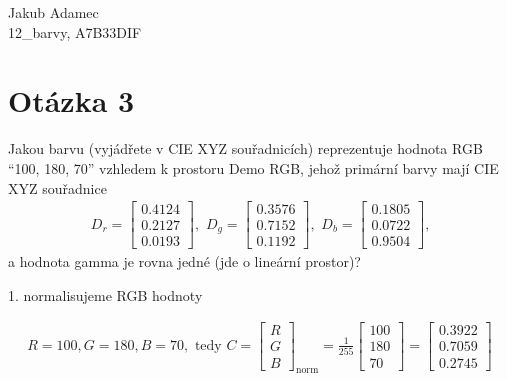 \documentclass[11pt,a4paper]{article}
\author{Jakub Adamec}
\begin{document}
\begin{center}
    \Huge Jakub Adamec \\
    \Large 12\_barvy, A7B33DIF \\ 
\end{center}

\section{Otázka 3} Jakou barvu (vyjádřete v CIE XYZ souřadnicích) reprezentuje hodnota RGB \enquote{100, 180, 70}
vzhledem k prostoru Demo RGB, jehož primární barvy mají CIE XYZ souřadnice
\begin{align}
    D_r = \begin{bmatrix} 0.4124 \\ 0.2127 \\ 0.0193 \end{bmatrix}\text{, } \, 
    D_g = \begin{bmatrix} 0.3576 \\ 0.7152 \\ 0.1192 \end{bmatrix}\text{, } \,
    D_b = \begin{bmatrix} 0.1805 \\ 0.0722 \\ 0.9504 \end{bmatrix}\text{,}
\end{align}
a hodnota gamma je rovna jedné (jde o lineární prostor)?

1. normalisujeme RGB hodnoty

\begin{align}
    R=100, G=180, B=70, \, \, \text{tedy } C = \begin{bmatrix}R \\ G \\ B \end{bmatrix}_{\text{norm}}
    = \frac{1}{255}\begin{bmatrix}100 \\ 180 \\ 70 \end{bmatrix} = 
    \begin{bmatrix} 0.3922 \\ 0.7059 \\ 0.2745\end{bmatrix}
\end{align}
\end{document}
